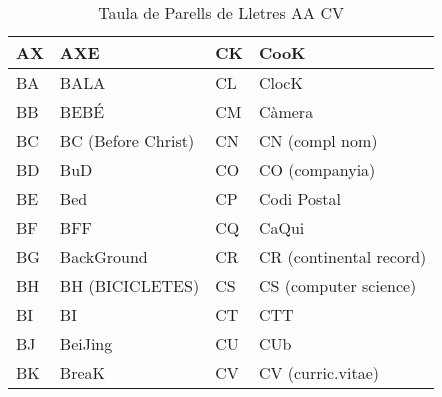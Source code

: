 \begin{table}[!ht]
\begin{tabular}{|l|l|l|l|}
    AX & AXE                & CK & CooK                    \\ \hline
    BA & BALA               & CL & ClocK                   \\ \hline
    BB & BEBÉ               & CM & Càmera                  \\ \hline
    BC & BC (Before Christ) & CN & CN (compl nom)          \\ \hline
    BD & BuD                & CO & CO (companyia)          \\ \hline
    BE & Bed                & CP & Codi Postal             \\ \hline
    BF & BFF                & CQ & CaQui                   \\ \hline
    BG & BackGround         & CR & CR (continental record) \\ \hline
    BH & BH (BICICLETES)    & CS & CS (computer science)   \\ \hline
    BI & BI                 & CT & CTT                     \\ \hline
    BJ & BeiJing            & CU & CUb                     \\ \hline
    BK & BreaK              & CV & CV (curric.vitae)       \\ \hline
    \end{tabular}
    \caption{Taula de Parells de Lletres AA \rightarrow CV}
    \label{tla:lletres-1}
    \end{table}


